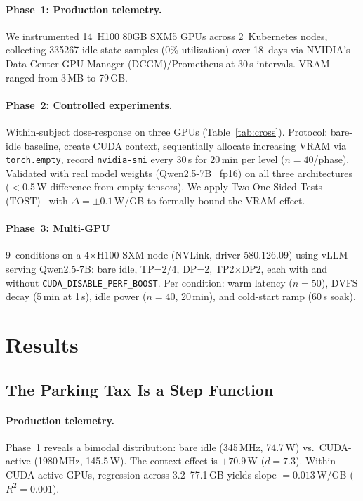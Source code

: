\documentclass[sigconf,anonymous,review]{acmart}
\newcommand{\perfboost}{\texttt{CUDA\_\hspace{0pt}DISABLE\_\hspace{0pt}PERF\_\hspace{0pt}BOOST}}
\begin{document}
\paragraph{Phase~1: Production telemetry.} We instrumented 14~H100 80GB SXM5 GPUs across 2~Kubernetes nodes, collecting \num{335267} idle-state samples (0\% utilization) over 18~days via NVIDIA's Data Center GPU Manager (DCGM)/Prometheus at 30\,s intervals. VRAM ranged from 3\,MB to 79\,GB.

\paragraph{Phase~2: Controlled experiments.} Within-subject dose-response on three GPUs (Table~\ref{tab:cross}). Protocol: bare-idle baseline, create CUDA context, sequentially allocate increasing VRAM via \texttt{torch.empty}, record \texttt{nvidia-smi} every 30\,s for 20\,min per level ($n=40$/phase). Validated with real model weights (Qwen2.5-7B~\cite{qwen2} fp16) on all three architectures ($<$0.5\,W difference from empty tensors). We apply Two One-Sided Tests (TOST)~\cite{schuirmann-tost} with $\Delta = \pm 0.1$\,W/GB to formally bound the VRAM effect.

\paragraph{Phase~3: Multi-GPU} 9~conditions on a 4$\times$H100 SXM node (NVLink, driver 580.126.09) using vLLM~\cite{vllm} serving Qwen2.5-7B: bare idle, TP=2/4, DP=2, TP2$\times$DP2, each with and without \perfboost. Per condition: warm latency ($n=50$), DVFS decay (5\,min at 1\,s), idle power ($n=40$, 20\,min), and cold-start ramp (60\,s soak).

\section{Results}

\subsection{The Parking Tax Is a Step Function}

\paragraph{Production telemetry.} Phase~1 reveals a bimodal distribution: bare idle (345\,MHz, 74.7\,W) vs.\ CUDA-active (1980\,MHz, 145.5\,W). The context effect is $+70.9$\,W ($d = 7.3$). Within CUDA-active GPUs, regression across 3.2--77.1\,GB yields slope $= 0.013$\,W/GB ($R^2 = 0.001$).
\end{document}
